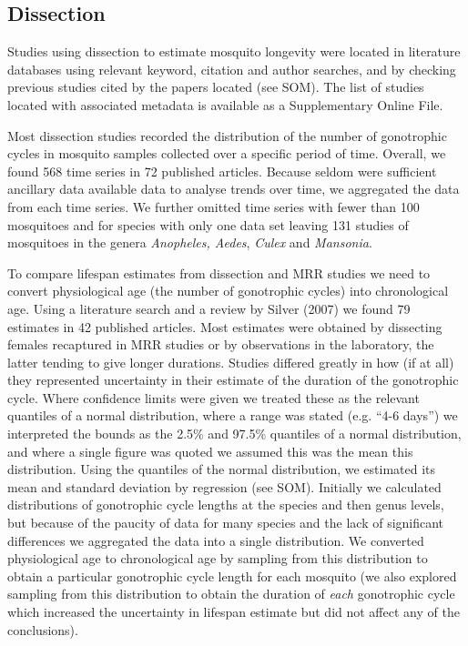 \documentclass[]{article}
\begin{document}
\subsection{Dissection}\label{dissection}

Studies using dissection to estimate mosquito longevity were located in
literature databases using relevant keyword, citation and author
searches, and by checking previous studies cited by the papers located
(see SOM). The list of studies located with associated metadata is
available as a Supplementary Online File.

Most dissection studies recorded the distribution of the number of
gonotrophic cycles in mosquito samples collected over a specific period
of time. Overall, we found 568 time series in 72 published articles.
Because seldom were sufficient ancillary data available data to analyse
trends over time, we aggregated the data from each time series. We
further omitted time series with fewer than 100 mosquitoes and for
species with only one data set leaving 131 studies of mosquitoes in the
genera \emph{Anopheles, Aedes}, \emph{Culex} and \emph{Mansonia}.

To compare lifespan estimates from dissection and MRR studies we need to
convert physiological age (the number of gonotrophic cycles) into
chronological age. Using a literature search and a review by Silver
(2007) we found 79 estimates in 42 published articles. Most estimates
were obtained by dissecting females recaptured in MRR studies or by
observations in the laboratory, the latter tending to give longer
durations. Studies differed greatly in how (if at all) they represented
uncertainty in their estimate of the duration of the gonotrophic cycle.
Where confidence limits were given we treated these as the relevant
quantiles of a normal distribution, where a range was stated (e.g. ``4-6
days'') we interpreted the bounds as the 2.5\% and 97.5\% quantiles of a
normal distribution, and where a single figure was quoted we assumed
this was the mean this distribution. Using the quantiles of the normal
distribution, we estimated its mean and standard deviation by regression
(see SOM). Initially we calculated distributions of gonotrophic cycle
lengths at the species and then genus levels, but because of the paucity
of data for many species and the lack of significant differences we
aggregated the data into a single distribution. We converted
physiological age to chronological age by sampling from this
distribution to obtain a particular gonotrophic cycle length for each
mosquito (we also explored sampling from this distribution to obtain the
duration of \emph{each} gonotrophic cycle which increased the
uncertainty in lifespan estimate but did not affect any of the
conclusions).
\end{document}
